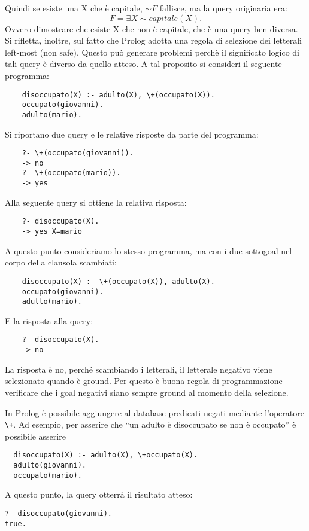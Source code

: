 \documentclass[answers, a4paper, 11pt]{exam}
\begin{document}
\begin{questions}
\begin{solution}
\begin{equation*}
  \end{equation*}
  Quindi se esiste una X che è capitale, $\sim F$ fallisce, ma la query originaria era:
  \begin{equation*}
    F= \exists X \sim capitale(X).
  \end{equation*}
  Ovvero dimostrare che esiste X che non è capitale, che è una query ben diversa.
  Si rifletta, inoltre, sul fatto che Prolog adotta una regola di selezione dei letterali left-most (non safe). Questo può generare problemi perchè il significato logico di tali query è diverso da quello atteso.
  A tal proposito si consideri il seguente programma:
  \begin{verbatim}
    disoccupato(X) :- adulto(X), \+(occupato(X)).
    occupato(giovanni).
    adulto(mario).
  \end{verbatim}
  Si riportano due query e le relative risposte da parte del programma:
  \begin{verbatim}
    ?- \+(occupato(giovanni)).
    -> no
    ?- \+(occupato(mario)).
    -> yes
  \end{verbatim}
  Alla seguente query si ottiene la relativa risposta:
  \begin{verbatim}
    ?- disoccupato(X).
    -> yes X=mario
  \end{verbatim}
  A questo punto consideriamo lo stesso programma, ma con i due sottogoal nel corpo della clausola scambiati:
  \begin{verbatim}
    disoccupato(X) :- \+(occupato(X)), adulto(X).
    occupato(giovanni).
    adulto(mario).
  \end{verbatim}
  E la risposta alla query:
  \begin{verbatim}
    ?- disoccupato(X).
    -> no
  \end{verbatim}
  La risposta è no, perché scambiando i letterali, il letterale negativo viene selezionato quando è ground.
  Per questo è buona regola di programmazione verificare che i goal negativi siano sempre ground al momento della selezione.


  In Prolog è possibile aggiungere al database predicati negati mediante l'operatore \texttt{\textbackslash +}. 
  Ad esempio, per asserire che ``un adulto è disoccupato se non è occupato'' è possibile asserire 
  \begin{verbatim}
  disoccupato(X) :- adulto(X), \+occupato(X).
  adulto(giovanni).
  occupato(mario).
  \end{verbatim}
  A questo punto, la query otterrà il risultato atteso:
  \begin{verbatim}
?- disoccupato(giovanni).
true.


\end{verbatim}
\end{solution}
\end{questions}
\end{document}
